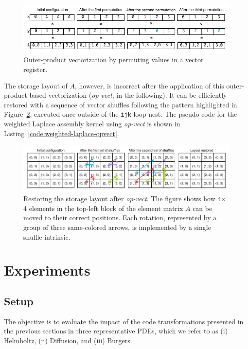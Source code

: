 \begin{figure}[h]
\centerline{\includegraphics[scale=0.6]{lowlevelopt/pictures/vect-by-vect-inline.pdf}}
\caption{Outer-product vectorization by permuting values in a vector register.}
\label{fig:vect-by-vect}
\end{figure}

The storage layout of $A$, however, is incorrect after the application of this outer-product-based vectorization (\emph{op-vect}, in the following). It can be efficiently restored with a sequence of vector shuffles following the pattern highlighted in Figure~\ref{fig:restore-layout}, executed once outside of the \texttt{ijk} loop nest. The pseudo-code for the weighted Laplace assembly kernel using \emph{op-vect} is shown in Listing~\ref{code:weighted-laplace-opvect}.

\begin{figure}[h]
\centerline{\includegraphics[scale=0.6]{lowlevelopt/pictures/vect-restore-inline.pdf}}
\caption{Restoring the storage layout after \emph{op-vect}. The figure shows how 4$\times$4 elements in the top-left block of the element matrix $A$ can be moved to their correct positions. Each rotation, represented by a group of three same-colored arrows, is implemented by a single shuffle intrinsic.}
\label{fig:restore-layout}
\end{figure}



\section{Experiments}
\label{sec:coffee-perfeval}

\subsection{Setup}
The objective is to evaluate the impact of the code transformations presented in the previous sections in three representative PDEs, which we refer to as (i) Helmholtz, (ii) Diffusion, and (iii) Burgers. 

